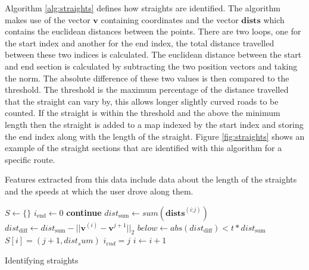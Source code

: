 \documentclass[a4paper, 11pt, twocolumn]{report}
\begin{document}
Algorithm \ref{alg:straights} defines how straights are identified.
The algorithm makes use of the vector $\mathbf{v}$ containing coordinates and the vector $\mathbf{dists}$ which contains the euclidean distances between the points.
There are two loops, one for the start index and another for the end index, the total distance travelled between these two indices is calculated.
The euclidean distance between the start and end section is calculated by subtracting the two position vectors and taking the norm.
The absolute difference of these two values is then compared to the threshold.
The threshold is the maximum percentage of the distance travelled that the straight can vary by, this allows longer slightly curved roads to be counted.
If the straight is within the threshold and the above the minimum length then the straight is added to a map indexed by the start index and storing the end index along with the length of the straight.
Figure \ref{fig:straights} shows an example of the straight sections that are identified with this algorithm for a specific route.

Features extracted from this data include data about the length of the straights and the speeds at which the user drove along them.

\begin{algorithm}
\begin{algorithmic}
    \State $S \gets \{\}$
    \State $i_{\text{end}} \gets 0$
            \State \textbf{continue}
        \EndIf
            \State $dist_{\text{sum}} \gets sum(\mathbf{dists}^{(i\text{:}j)})$
            \State $dist_{\text{diff}} \gets dist_{\text{sum}} - ||\mathbf{v}^{(i)} - \mathbf{v}^{j+1}||_2$
            \State $below \gets abs(dist_{\text{diff}}) < t * dist_{\text{sum}}$
                \State $S[i] = (j+1, dist_sum)$
                \State $i_{end} = j$
            \EndIf
        \EndFor
        \State $i \gets i+1$
    \EndWhile
\end{algorithmic}
\caption{Identifying straights}
\label{alg:straights}
\end{algorithm}
\end{document}
